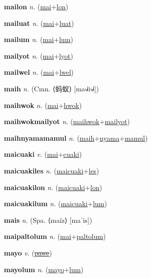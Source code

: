 \textbf{\hypertarget{mailon}{mailon}} \textit{n.} (\hyperlink{mai}{mai}+\allowbreak \hyperlink{lon}{lon})


\textbf{\hypertarget{mailuat}{mailuat}} \textit{n.} (\hyperlink{mai}{mai}+\allowbreak \hyperlink{luat}{luat})


\textbf{\hypertarget{mailum}{mailum}} \textit{n.} (\hyperlink{mai}{mai}+\allowbreak \hyperlink{lum}{lum})


\textbf{\hypertarget{mailyot}{mailyot}} \textit{n.} (\hyperlink{mai}{mai}+\allowbreak \hyperlink{lyot}{lyot})


\textbf{\hypertarget{mailwel}{mailwel}} \textit{n.} (\hyperlink{mai}{mai}+\allowbreak \hyperlink{lwel}{lwel})


\textbf{\hypertarget{maih}{maih}} \textit{n.} (Cmn. ⟨{\chinese{}蚂蚁}⟩ [ma˧˩˧i˧˩˧])


\textbf{\hypertarget{maihwok}{maihwok}} \textit{n.} (\hyperlink{mai}{mai}+\allowbreak \hyperlink{hwok}{hwok})


\textbf{\hypertarget{maihwokmailyot}{maihwokmailyot}} \textit{n.} (\hyperlink{maihwok}{maihwok}+\allowbreak \hyperlink{mailyot}{mailyot})


\textbf{\hypertarget{maihnyamamamul}{maihnyamamamul}} \textit{n.} (\hyperlink{maih}{maih}+\allowbreak \hyperlink{nyama}{nyama}+\allowbreak \hyperlink{mamul}{mamul})


\textbf{\hypertarget{maicuaki}{maicuaki}} \textit{v.} (\hyperlink{mai}{mai}+\allowbreak \hyperlink{cuaki}{cuaki})


\textbf{\hypertarget{maicuakiles}{maicuakiles}} \textit{n.} (\hyperlink{maicuaki}{maicuaki}+\allowbreak \hyperlink{les}{les})


\textbf{\hypertarget{maicuakilon}{maicuakilon}} \textit{n.} (\hyperlink{maicuaki}{maicuaki}+\allowbreak \hyperlink{lon}{lon})


\textbf{\hypertarget{maicuakilum}{maicuakilum}} \textit{n.} (\hyperlink{maicuaki}{maicuaki}+\allowbreak \hyperlink{lum}{lum})


\textbf{\hypertarget{mais}{mais}} \textit{n.} (Spa. ⟨maíz⟩ [maˈis])


\textbf{\hypertarget{maipaltolum}{maipaltolum}} \textit{n.} (\hyperlink{mai}{mai}+\allowbreak \hyperlink{paltolum}{paltolum})


\textbf{\hypertarget{mayo}{mayo}} \textit{v.} (\hyperlink{pawe}{\sout{pawe}})


\textbf{\hypertarget{mayolum}{mayolum}} \textit{n.} (\hyperlink{mayo}{mayo}+\allowbreak \hyperlink{lum}{lum})


